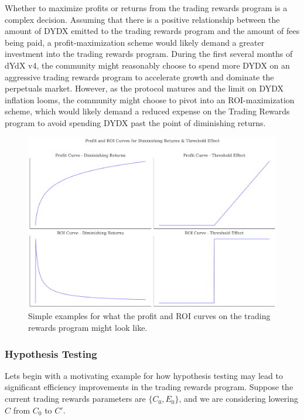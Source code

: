             Whether to maximize profits or returns from the trading rewards program is a complex decision. Assuming that there is a positive relationship between the amount of DYDX emitted to the trading rewards program and the amount of fees being paid, a profit-maximization scheme would likely demand a greater investment into the trading rewards program. During the first several months of dYdX v4, the community might reasonably choose to spend more DYDX on an aggressive trading rewards program to accelerate growth and dominate the perpetuals market. However, as the protocol matures and the limit on DYDX inflation looms, the community might choose to pivot into an ROI-maximization scheme, which would likely demand a reduced expense on the Trading Rewards program to avoid spending DYDX past the point of diminishing returns.

            \begin{figure}[htp]
                \centering
                \includegraphics[width=\linewidth]{figs/roi_profit_curves.png}
                \caption{Simple examples for what the profit and ROI curves on the trading rewards program might look like.}
                \label{fig:roi_profit_curves}
            \end{figure}

        \subsubsection{Hypothesis Testing}

            Lets begin with a motivating example for how hypothesis testing may lead to significant efficiency improvements in the trading rewards program. Suppose the current trading rewards parameters are $\{C_0, E_0\}$, and we are considering lowering $C$ from $C_0$ to $C'$.

